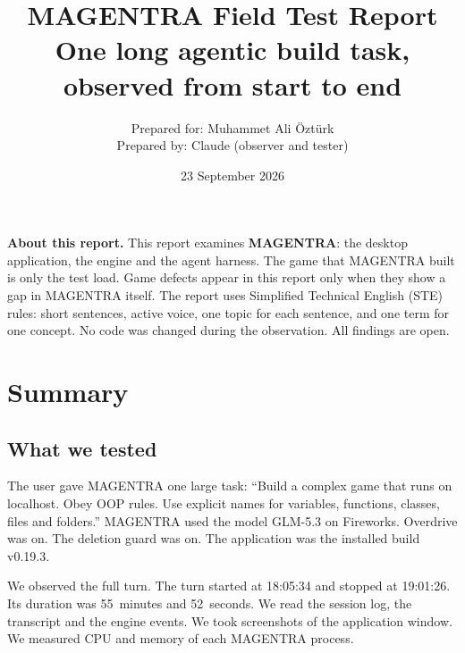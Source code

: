 \documentclass[11pt,a4paper]{article}
\title{\textbf{MAGENTRA Field Test Report}\\[4pt]
\large One long agentic build task, observed from start to end}
\author{Prepared for: Muhammet Ali Öztürk\\
Prepared by: Claude (observer and tester)}
\date{23 September 2026}
\begin{document}
\maketitle
\thispagestyle{fancy}

\begin{tcolorbox}[colback=white, colframe=black!40, boxrule=0.5pt, arc=1.5pt]
\textbf{About this report.} This report examines \textbf{MAGENTRA}: the desktop
application, the engine and the agent harness. The game that MAGENTRA built is
only the test load. Game defects appear in this report only when they show a gap
in MAGENTRA itself. The report uses Simplified Technical English (STE) rules:
short sentences, active voice, one topic for each sentence, and one term for one
concept. No code was changed during the observation. All findings are open.
\end{tcolorbox}

\tableofcontents
\newpage

\section{Summary}

\subsection{What we tested}
The user gave MAGENTRA one large task: ``Build a complex game that runs on
localhost. Obey OOP rules. Use explicit names for variables, functions, classes,
files and folders.'' MAGENTRA used the model GLM-5.3 on Fireworks. Overdrive was
on. The deletion guard was on. The application was the installed build v0.19.3.

We observed the full turn. The turn started at 18:05:34 and stopped at 19:01:26.
Its duration was 55~minutes and 52~seconds. We read the session log, the
transcript and the engine events. We took screenshots of the application window.
We measured CPU and memory of each MAGENTRA process.
\end{document}
